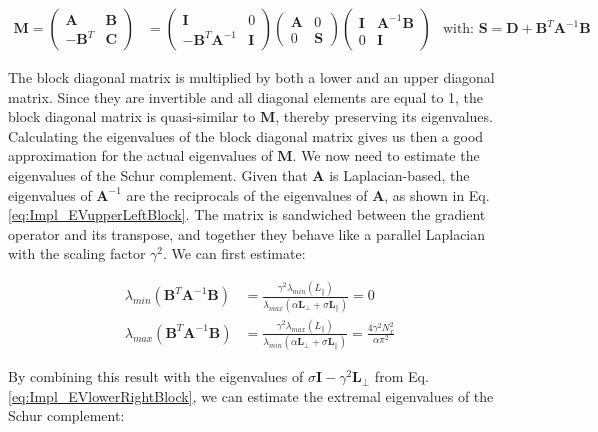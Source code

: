 \begin{align}
	\textbf{M} = \begin{pmatrix}
		\textbf{A} & \textbf{B} \\ -\textbf{B}^T & \textbf{C} 
	\end{pmatrix} &= \begin{pmatrix}
		\textbf{I} & 0 \\ -\textbf{B}^T\textbf{A}^{-1} & \textbf{I}
	\end{pmatrix}\begin{pmatrix}
		\textbf{A} & 0 \\ 0 & \textbf{S}
	\end{pmatrix}\begin{pmatrix}
		\textbf{I} & \textbf{A}^{-1}\textbf{B} \\ 0 & \textbf{I}
	\end{pmatrix} & \text{with: } 
	\textbf{S} = \textbf{D} + \textbf{B}^T \textbf{A}^{-1}\textbf{B}
\end{align}


The block diagonal matrix is multiplied by both a lower and an upper diagonal matrix. Since they are invertible and all diagonal elements are equal to 1, the block diagonal matrix is quasi-similar to $\textbf{M}$\cite{gallier2010schur}, thereby preserving its eigenvalues. Calculating the eigenvalues of the block diagonal matrix gives us then a good approximation for the actual eigenvalues of $\textbf{M}$. We now need to estimate the eigenvalues of the Schur complement. Given that $\textbf{A}$ is Laplacian-based, the eigenvalues of $\textbf{A}^{-1}$ are the reciprocals of the eigenvalues of $\textbf{A}$, as shown in Eq. \ref{eq:Impl_EVupperLeftBlock}. The matrix is sandwiched between the gradient operator and its transpose, and together they behave like a parallel Laplacian with the scaling factor $\gamma^2$. We can first estimate:

\begin{align}
	\lambda_{min}(\textbf{B}^T \textbf{A}^{-1}\textbf{B}) &= \frac{\gamma^2\lambda_{min}(L_\parallel)}{\lambda_{max}(\alpha \textbf{L}_\perp + \sigma \textbf{L}_\parallel)} = 0 \\ 
	\lambda_{max}(\textbf{B}^T \textbf{A}^{-1}\textbf{B}) &= \frac{\gamma^2\lambda_{max}(L_\parallel)}{\lambda_{min}(\alpha \textbf{L}_\perp + \sigma \textbf{L}_\parallel)} = \frac{4\gamma^2N_x^2}{\alpha\pi^2}
\end{align}

By combining this result with the eigenvalues of $\sigma \textbf{I} - \gamma^2 \textbf{L}_\perp$ from Eq. \ref{eq:Impl_EVlowerRightBlock}, we can estimate the extremal eigenvalues of the Schur complement:

